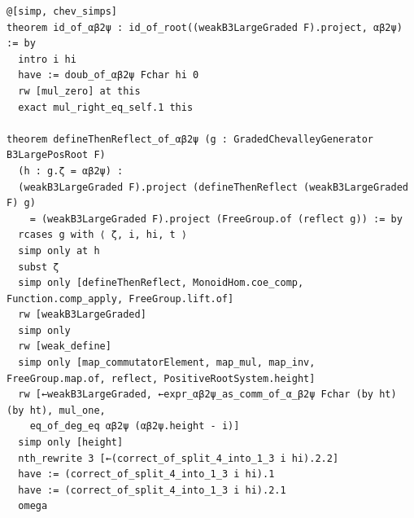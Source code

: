\begin{Verbatim}
@[simp, chev_simps]
theorem id_of_αβ2ψ : id_of_root((weakB3LargeGraded F).project, αβ2ψ) := by
  intro i hi
  have := doub_of_αβ2ψ Fchar hi 0
  rw [mul_zero] at this
  exact mul_right_eq_self.1 this

theorem defineThenReflect_of_αβ2ψ (g : GradedChevalleyGenerator B3LargePosRoot F)
  (h : g.ζ = αβ2ψ) :
  (weakB3LargeGraded F).project (defineThenReflect (weakB3LargeGraded F) g)
    = (weakB3LargeGraded F).project (FreeGroup.of (reflect g)) := by
  rcases g with ⟨ ζ, i, hi, t ⟩
  simp only at h
  subst ζ
  simp only [defineThenReflect, MonoidHom.coe_comp, Function.comp_apply, FreeGroup.lift.of]
  rw [weakB3LargeGraded]
  simp only
  rw [weak_define]
  simp only [map_commutatorElement, map_mul, map_inv, FreeGroup.map.of, reflect, PositiveRootSystem.height]
  rw [←weakB3LargeGraded, ←expr_αβ2ψ_as_comm_of_α_β2ψ Fchar (by ht) (by ht), mul_one,
    eq_of_deg_eq αβ2ψ (αβ2ψ.height - i)]
  simp only [height]
  nth_rewrite 3 [←(correct_of_split_4_into_1_3 i hi).2.2]
  have := (correct_of_split_4_into_1_3 i hi).1
  have := (correct_of_split_4_into_1_3 i hi).2.1
  omega
\end{Verbatim}
